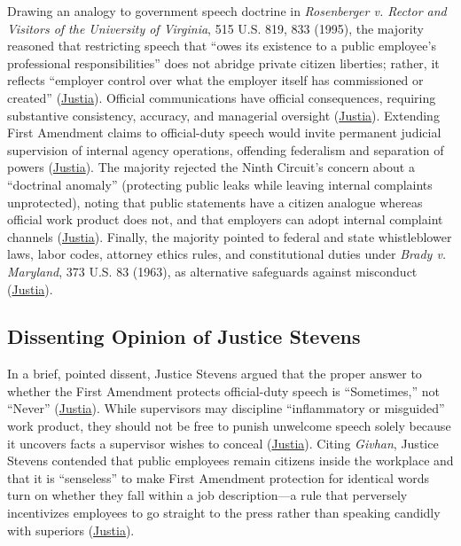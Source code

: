\documentclass[12pt]{article}
\begin{document}
Drawing an analogy to government speech doctrine in \textit{Rosenberger v. Rector and Visitors of the University of Virginia}, 515 U.S. 819, 833 (1995), the majority reasoned that restricting speech that ``owes its existence to a public employee's professional responsibilities'' does not abridge private citizen liberties; rather, it reflects ``employer control over what the employer itself has commissioned or created'' (\href{https://supreme.justia.com/cases/federal/us/547/410/}{Justia}). Official communications have official consequences, requiring substantive consistency, accuracy, and managerial oversight (\href{https://supreme.justia.com/cases/federal/us/547/410/}{Justia}). Extending First Amendment claims to official-duty speech would invite permanent judicial supervision of internal agency operations, offending federalism and separation of powers (\href{https://supreme.justia.com/cases/federal/us/547/410/}{Justia}). The majority rejected the Ninth Circuit's concern about a ``doctrinal anomaly'' (protecting public leaks while leaving internal complaints unprotected), noting that public statements have a citizen analogue whereas official work product does not, and that employers can adopt internal complaint channels (\href{https://supreme.justia.com/cases/federal/us/547/410/}{Justia}). Finally, the majority pointed to federal and state whistleblower laws, labor codes, attorney ethics rules, and constitutional duties under \textit{Brady v. Maryland}, 373 U.S. 83 (1963), as alternative safeguards against misconduct (\href{https://supreme.justia.com/cases/federal/us/547/410/}{Justia}).

\subsection{Dissenting Opinion of Justice Stevens}

In a brief, pointed dissent, Justice Stevens argued that the proper answer to whether the First Amendment protects official-duty speech is ``Sometimes,'' not ``Never'' (\href{https://supreme.justia.com/cases/federal/us/547/410/}{Justia}). While supervisors may discipline ``inflammatory or misguided'' work product, they should not be free to punish unwelcome speech solely because it uncovers facts a supervisor wishes to conceal (\href{https://supreme.justia.com/cases/federal/us/547/410/}{Justia}). Citing \textit{Givhan}, Justice Stevens contended that public employees remain citizens inside the workplace and that it is ``senseless'' to make First Amendment protection for identical words turn on whether they fall within a job description---a rule that perversely incentivizes employees to go straight to the press rather than speaking candidly with superiors (\href{https://supreme.justia.com/cases/federal/us/547/410/}{Justia}).
\end{document}
